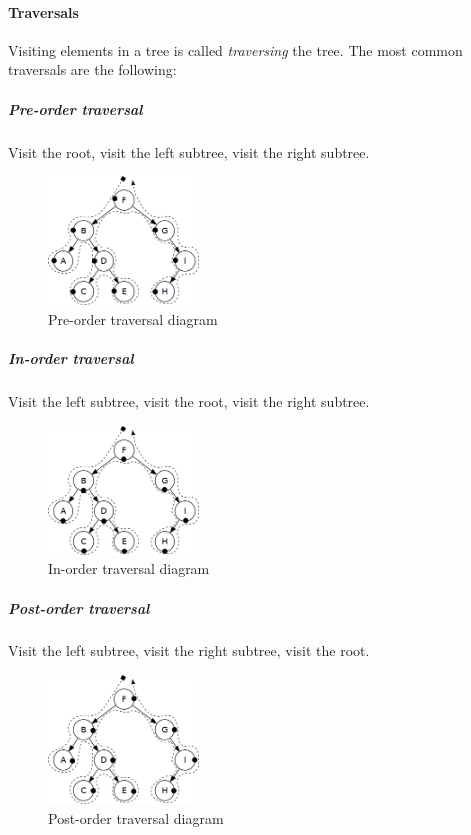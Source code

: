 \documentclass{article}
\begin{document}
\begin{samepage}
  \paragraph{Traversals}
  Visiting elements in a tree is called {\em traversing} the tree. The most common traversals are the following:

  \subparagraph{Pre-order traversal}
  Visit the root, visit the left subtree, visit the right subtree.

  \begin{figure}[H]
    \centering
    \includegraphics[width=4cm]{pre_order_traversal}
    \caption{Pre-order traversal diagram}
  \end{figure}

  \subparagraph{In-order traversal}
  Visit the left subtree, visit the root, visit the right subtree.

  \begin{figure}[H]
    \centering
    \includegraphics[width=4cm]{in_order_traversal}
    \caption{In-order traversal diagram}
  \end{figure}

  \subparagraph{Post-order traversal}
  Visit the left subtree, visit the right subtree, visit the root.

  \begin{figure}[H]
    \centering
    \includegraphics[width=4cm]{post_order_traversal}
    \caption{Post-order traversal diagram}
  \end{figure}
\end{samepage}
\end{document}
